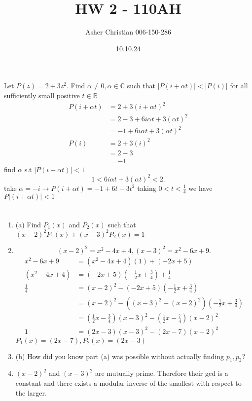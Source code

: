 \documentclass{article}
\title{HW 2 - 110AH}
\author{Asher Christian 006-150-286}
\date{ 10.10.24}
\begin{document}
    \maketitle
    \section{}
    Let $P(z) = 2 + 3z^2$. Find $\alpha \ne 0, \alpha \in \mathbb{C}$ such that
    $|P(i+\alpha t)| < |P(i)|$ for all sufficiently small positive  $t \in \mathbb{R}$
    \begin{align*}
        P(i+\alpha t) &= 2 + 3(i+\alpha t)^2\\
                 &= 2 - 3 + 6i\alpha t + 3(\alpha t)^2\\
                 &= -1 + 6i\alpha t + 3(\alpha t)^2\\
        P(i) &= 2 + 3(i)^2\\
             &= 2 - 3\\
             &= -1
    \end{align*}
    find $\alpha$ s.t $|P(i + \alpha t)| < 1$
     \[
         1 < 6i\alpha t + 3(\alpha t)^2 < 2
    .\] 
    take $\alpha = -i \rightarrow P(i+\alpha t) = -1 + 6t-3t^2$  taking $0 < t < \frac{1}{4}$ we have $P|(i + \alpha t)| < 1$
    \section{}
    \begin{enumerate}
        \item (a) Find $P_1(x)$ and $P_2(x)$ such that $(x-2)^2P_1(x) + (x-3)^2P_2(x) = 1$ 
        \item \[
                (x-2)^2 = x^2-4x+4, (x-3)^2 = x^2-6x+9 
        .\] 
        \begin{align*}
            x^2-6x+9 &= (x^2-4x+4)(1) + (-2x +5)\\
            (x^2-4x+4) &= (-2x+5)(-\frac{1}{2}x+\frac{3}{4})+\frac{1}{4}\\
            \frac{1}{4}&=(x-2)^2-(-2x+5)(-\frac{1}{2}x+\frac{3}{4})\\
                       &= (x-2)^2-((x-3)^2-(x-2)^2)(-\frac{1}{2}x+\frac{3}{4})\\
                       &=(\frac{1}{2}x-\frac{3}{4})(x-3)^2-(\frac{1}{2}x-\frac{7}{4})(x-2)^2\\
            1 &= (2x-3)(x-3)^2-(2x-7)(x-2)^2
        \end{align*}
        $P_1(x)=(2x-7), P_2(x)=(2x-3)$
       \item (b)
           How did you know part (a) was possible without actually finding $p_1,p_2$?
       \item 
           $(x-2)^2$ and $(x-3)^2$ are mutually prime. Therefore their gcd is a constant and there exists a modular inverse of the smallest with respect to the larger.
    \end{enumerate}
\end{document}
